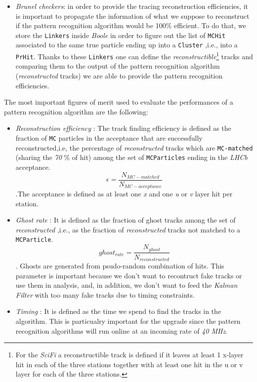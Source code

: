 \documentclass[paper=a4, fontsize=10pt]{scrartcl}
\numberwithin{equation}{section}		%
\numberwithin{figure}{section}			%
\numberwithin{table}{section}				%
\begin{document}
\begin{itemize}
\item{\textit{Brunel checkers}: in order to provide the tracing reconstruction efficiencies, it is important to propagate the information of what we suppose to reconstruct if the pattern recognition algorithm would be 100$\%$ efficient. To do that, we store the \texttt{Linkers} inside \textit{Boole} in order to figure out the list of \texttt{MCHit} associated to the same true particle ending up into a \texttt{Cluster} ,i.e.,  into a \texttt{PrHit}. Thanks to these \texttt{Linkers} one can define the \textit{reconstructible}\footnote{For the \textit{SciFi} a reconstructible track is defined if it leaves at least 1 x-layer hit in each of the three stations together with at least one hit in the u or v layer for each of the three stations.} tracks and comparing them to the output of the pattern recognition algorithm (\textit{reconstructed} tracks) we are able to provide the pattern recognition efficiencies.}
\end{itemize}

The most important figures of merit used to evaluate the performances of a pattern recognition algorithm are the following:
\begin{itemize}
 \item{\textit{Reconstruction efficiency} : The track finding efficiency is defined as the fraction of \texttt{MC} particles in the acceptance that are successfully reconstructed,i.e, the percentage of \textit{reconstructed} tracks which are \texttt{MC-matched} (sharing the \textit{70} $\%$ of hit) among the set of \texttt{MCParticles} ending in the \textit{LHCb} acceptance. $$\epsilon = \frac{N_{MC-matched}}{N_{MC-acceptance}}$$.The acceptance is defined as at least one \textit{x} and one \textit{u} or \textit{v} layer hit per station.}
 \item{\textit{Ghost rate} : It is defined as the fraction of ghost tracks among the set of \textit{reconstructed} ,i.e., as the fraction of \textit{reconstructed} tracks not matched to a \texttt{MCParticle}.$$ghost_{rate} = \frac{N_{ghost}}{N_{reconstructed}}$$. Ghosts are generated from psudo-random combination of hits. This parameter is important because we don't want to recontruct fake tracks or use them in analysis, and, in addition, we don't want to feed the \textit{Kalman Filter} with too many fake tracks due to timing constraints.}
 \item{\textit{Timing} : It is defined as the time we spend to find the tracks in the algorithm. This is particualry important for the upgrade since the pattern recognition algorithms will run online at an incoming rate of \textit{40 MHz}.}
\end{itemize}
\end{document}
